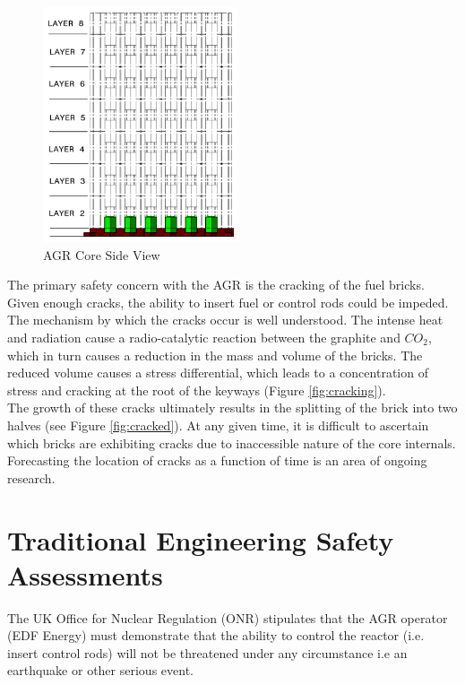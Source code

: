 \begin{figure}[ht!]
	\centering
	\includegraphics[scale=0.75]{Figures/AGR_side}
	\caption{AGR Core Side View}
	\label{fig:side}
\end{figure}

\noindent
The primary safety concern with the AGR is the cracking of the fuel bricks. Given enough cracks, the ability to insert fuel or control rods could be impeded. The mechanism by which the cracks occur is well understood. The intense heat and radiation cause a radio-catalytic reaction between the graphite and $CO_2$, which in turn causes a reduction in the mass and volume of the bricks. The reduced volume causes a stress differential, which leads to a concentration of stress and cracking at the root of the keyways (Figure \ref{fig:cracking}). \\ 

\noindent
The growth of these cracks ultimately results in the splitting of the brick into two halves (see Figure \ref{fig:cracked}). At any given time, it is difficult to ascertain which bricks are exhibiting cracks due to inaccessible nature of the core internals. Forecasting the location of cracks as a function of time is an area of ongoing research. 

\section{Traditional Engineering Safety Assessments} \label{Engineering}
The UK Office for Nuclear Regulation (ONR) stipulates that the AGR operator (EDF Energy) must demonstrate that the ability to control the reactor (i.e. insert control rods) will not be threatened under any circumstance i.e an earthquake or other serious event.\\

